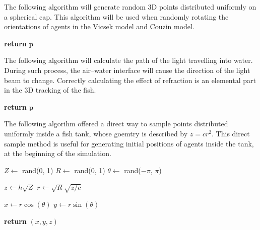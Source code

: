 \documentclass[11pt,twoside]{report}
\begin{document}
The following algorithm will generate random 3D points distributed uniformly on a spherical cap. This algorithm will be used when randomly rotating the orientations of agents in the Vicsek model and Couzin model.



\begin{tcolorbox}[
title=Algorithm to Generate Uniform Points on a Spherical Cap,
enlarge bottom by=0.5em,
enlarge top by=0.5em,
]

\label{alg:geometry-rand-cap}
\begin{algorithmic}


\State \textbf{return} $\mathbf{p}$
\EndProcedure
\end{algorithmic}

\end{tcolorbox}



The following algorithm will calculate the path of the light travelling into water. During such process, the air--water interface will cause the direction of the light beam to change. Correctly calculating the effect of refraction is an elemental part in the 3D tracking of the fish.



\begin{tcolorbox}[
title=Algorithm to Calculate the Direction of Light after Refraction,
enlarge bottom by=0.5em,
enlarge top by=0.5em,
]

\label{alg:geometry-rand-cap}
\begin{algorithmic}


\State \textbf{return} $\mathbf{p}$
\EndProcedure
\end{algorithmic}

\end{tcolorbox}

The following algorihm offered a direct way to sample points distributed uniformly inside a fish tank, whose goemtry is described by $z = c r^2$. This direct sample method is useful for generating initial positions of agents inside the tank, at the beginning of the simulation.

\begin{tcolorbox}[
title=Algorithm to Sample Uniform Points in Fish Tank,
enlarge bottom by=0.5em,
enlarge top by=0.5em,
]

\label{alg:geometry-rand-cap}
\begin{algorithmic}

\State $Z \gets$ rand(0, 1)
\State $R \gets $ rand(0, 1)
\State $\theta \gets $ rand($-\pi$, $\pi$)

\State $z \gets h \sqrt{Z}$ 
\State $r \gets \sqrt{R} \sqrt{z / c}$

\State $x \gets r \cos(\theta)$
\State $y \gets r \sin(\theta)$

\State \textbf{return} $(x, y, z)$

\EndProcedure
\end{algorithmic}
\end{tcolorbox}
\end{document}
